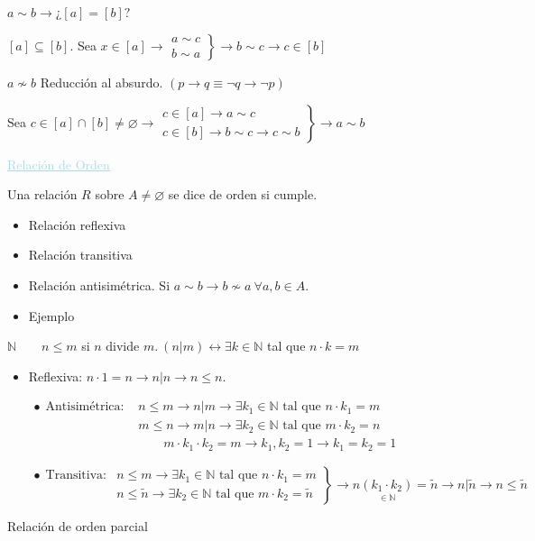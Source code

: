 \documentclass[12pt]{article}
\begin{document}
$a\sim b\rightarrow ¿[a]=[b] ?$

$[a]\subseteq[b]$. Sea $x\in[a]\rightarrow\left.\begin{array}{l}
	a\sim c\\
	b\sim a
\end{array}\right\}\rightarrow b\sim c\rightarrow c\in[b]$

$a\nsim b$ Reducción al absurdo. $(p\to q\equiv\neg q\to\neg p)$

Sea $c\in[a]\cap[b]\neq\varnothing\rightarrow\left.\begin{array}{l}
	c\in[a]\rightarrow a\sim c\\
	c\in[b]\rightarrow b\sim c\rightarrow c\sim b
\end{array} \right\}\rightarrow a\sim b$

\textcolor{lightblue}{\underline{Relación de Orden}}

Una relación $R$ sobre $A\neq\varnothing$ se dice de orden si cumple.
\begin{itemize}
	\item Relación reflexiva
	\item Relación transitiva
	\item Relación antisimétrica. Si $a\sim b\rightarrow b\nsim a~\forall a,b\in A$.
\end{itemize}
\begin{itemize}[label=\color{red}\textbullet, leftmargin=*]
	\item \color{lightblue}Ejemplo
\end{itemize}
$\mathbb{N}\qquad n\le m$ si $n$ divide $m.~(n|m)\leftrightarrow\exists k\in\mathbb{N}$ tal que {\color{lightblue}$n\cdot k=m$}
\begin{itemize}[leftmargin=*]
	\item Reflexiva: $n\cdot 1=n\rightarrow n|n\rightarrow n\le n$.
	
	$ \begin{array}{ll}
		\bullet~~\text{Antisimétrica: } & n\le m\rightarrow n|m\rightarrow\exists k_1\in\mathbb{N} \text{ tal que }n\cdot k_1=m\\
		& m\le n\rightarrow m|n\rightarrow\exists k_2\in\mathbb{N} \text{ tal que }m\cdot k_2=n\\
		& \qquad m\cdot k_1\cdot k_2=m\rightarrow k_1,k_2=1\rightarrow k_1=k_2=1
	\end{array}$
	
	$\left.\begin{array}{ll}
		\bullet~~\text{Transitiva:} & n\le m\rightarrow\exists k_1\in\mathbb{N}\text{ tal que } n\cdot k_1=m\\
		& n\le\tilde{n}\rightarrow\exists k_2\in\mathbb{N}\text{ tal que }m\cdot k_2=\tilde{n}
	\end{array}\right\}\rightarrow n\underset{\in\mathbb{N}}{(k_1\cdot k_2)}=\tilde{n}\rightarrow n|\tilde{n}\rightarrow n\le \tilde{n}$
\end{itemize}
Relación de orden parcial
\end{document}
